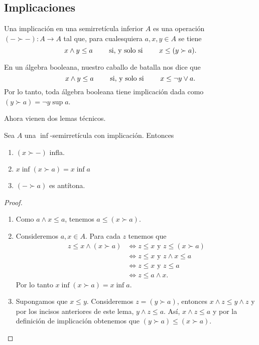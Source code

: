 \subsection{Implicaciones}

Una implicación en una semirretícula inferior $A$ es una operación
$(-\succ -):A\to A$ tal que, para cualesquiera $a,x,y\in A$ se tiene
\[
  x\wedge y\leq a \qquad\text{ si, y solo si }\qquad x\leq (y\succ a )
.\]

\begin{example}
  En un álgebra booleana, nuestro caballo de batalla nos dice que
  \[
    x\wedge y\leq a \qquad\text{ si, y solo si }\qquad
    x\leq \neg y\vee a
  .\]
  Por lo tanto, toda álgebra booleana tiene implicación dada
  como $(y\succ a)=\neg y\sup a$.
\end{example}

Ahora vienen dos lemas técnicos.
\begin{lemma}
  Sea $A$ una $\inf$-semirretícula con implicación.
  Entonces
  \begin{enumerate}
    \item $(x\succ -)$ infla.
    \item $x\inf(x\succ a) = x\inf a$
    \item $(-\succ a)$ es antítona.
  \end{enumerate}
\end{lemma}
\begin{proof}
    \begin{enumerate}
        \item Como $a\wedge x\leq a$, tenemos
        $a\leq (x\succ a).$
        \item Consideremos $a, x\in A$.
        Para cada $z$ tenemos que 
        \begin{align*}
            z\leq x\wedge (x\succ a)
            & \iff z\leq x \mbox{ y } z\leq (x\succ a)\\
            & \iff z\leq x \mbox{ y } z\wedge x\leq a\\
            & \iff z\leq x \mbox{ y } z\leq a\\
            & \iff z\leq a\wedge x.
        \end{align*}
        Por lo tanto $x\inf(x\succ a) = x\inf a$.
        \item Supongamos que $x\leq y$. Consideremos $z=(y\succ a)$, entonces $x\wedge z\leq y\wedge z$ y por los incisos anteriores de este lema, $y\wedge z\leq a$. Así, $x\wedge z\leq a$ y por la definición de implicación obtenemos que $(y\succ a)\leq (x\succ a)$. 
    \end{enumerate}
\end{proof}

